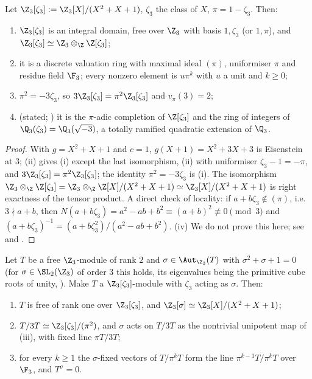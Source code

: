 \begin{theorem}[$\Z_3\lbrack\zeta_3\rbrack$]\label{thm:ant:z3zeta3dvr}
Let $\Z_3[\zeta_3]:=\Z_3[X]/(X^2+X+1)$, $\zeta_3$ the class of $X$, $\pi=1-\zeta_3$. Then:
\begin{enumerate}[label=(\roman*)]
\item $\Z_3[\zeta_3]$ is an integral domain, free over $\Z_3$ with basis $1,\zeta_3$ (or $1,\pi$), and $\Z_3[\zeta_3]\simeq\Z_3\otimes_\Z\Z[\zeta_3]$;
\item it is a discrete valuation ring with maximal ideal $(\pi)$, uniformiser $\pi$ and residue field $\F_3$; every nonzero element is $u\pi^k$ with $u$ a
unit and $k\ge0$;
\item $\pi^2=-3\zeta_3$, so $3\Z_3[\zeta_3]=\pi^2\Z_3[\zeta_3]$ and $v_\pi(3)=2$;
\item (stated; ) it is the $\pi$-adic completion of $\Z[\zeta_3]$ and the ring of integers of $\Q_3(\zeta_3)=\Q_3(\sqrt{-3})$, a totally
ramified quadratic extension of $\Q_3$.
\end{enumerate}
\end{theorem}

\begin{proof}
With $g=X^2+X+1$ and $c=1$, $g(X+1)=X^2+3X+3$ is Eisenstein at $3$; (ii) gives (i) except the last isomorphism, (ii) with uniformiser
$\zeta_3-1=-\pi$, and $3\Z_3[\zeta_3]=\pi^2\Z_3[\zeta_3]$; the identity $\pi^2=-3\zeta_3$ is (i). The isomorphism
$\Z_3\otimes_\Z\Z[\zeta_3]=\Z_3\otimes_\Z\Z[X]/(X^2+X+1)\simeq\Z_3[X]/(X^2+X+1)$ is right exactness of the tensor product. A direct check of locality: if
$a+b\zeta_3\notin(\pi)$, i.e. $3\nmid a+b$, then $N(a+b\zeta_3)=a^2-ab+b^2\equiv(a+b)^2\not\equiv0\pmod3$ and $(a+b\zeta_3)^{-1}=(a+b\zeta_3^2)/(a^2-ab+b^2)$.
(iv) We do not prove this here; see  and \cite[Chapter I, Section 6]{SerreLocalFields}.
\end{proof}

\begin{corollary}\label{cor:ant:z3zeta3modules}
Let $T$ be a free $\Z_3$-module of rank $2$ and $\sigma\in\Aut_{\Z_3}(T)$ with $\sigma^2+\sigma+1=0$ (for $\sigma\in\SL_2(\Z_3)$ of order $3$ this holds, its
eigenvalues being the primitive cube roots of unity, ). Make $T$ a $\Z_3[\zeta_3]$-module with $\zeta_3$ acting as $\sigma$. Then:
\begin{enumerate}[label=(\roman*)]
\item $T$ is free of rank one over $\Z_3[\zeta_3]$, and $\Z_3[\sigma]\simeq\Z_3[X]/(X^2+X+1)$;
\item $T/3T\simeq\Z_3[\zeta_3]/(\pi^2)$, and $\sigma$ acts on $T/3T$ as the nontrivial unipotent map of (iii), with fixed line $\pi T/3T$;
\item for every $k\ge1$ the $\sigma$-fixed vectors of $T/\pi^kT$ form the line $\pi^{k-1}T/\pi^kT$ over $\F_3$, and $T^\sigma=0$.
\end{enumerate}
\end{corollary}


